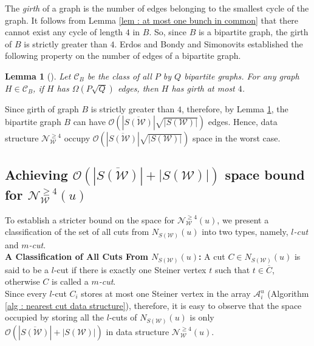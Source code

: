 \documentclass[letterpaper,11pt]{article}
\newtheorem{lemma}{Lemma}[]
\begin{document}
The \textit{girth} of a graph is the number of edges belonging to the smallest cycle of the graph. It follows from Lemma \ref{lem : at most one bunch in common} that there cannot exist any cycle of length $4$ in $B$. So, since $B$ is a bipartite graph, the girth of $B$ is strictly greater than $4$. Erdos \cite{erdos1964extremal} and Bondy and Simonovits \cite{bondy1974cycles} established the following property on the number of edges of a bipartite graph. 
\begin{lemma} [\cite{erdos1964extremal, bondy1974cycles}] \label{lem : girth is 4}
    Let ${\mathcal C}_B$ be the class of all $P$ by $Q$ bipartite graphs. For any graph $H\in {\mathcal C}_B$, if $H$ has ${\Omega}(P\sqrt{Q})$ edges, then $H$ has girth at most $4$.    
\end{lemma}
Since girth of graph $B$ is strictly greater than $4$, therefore, by Lemma \ref{lem : girth is 4}, the bipartite graph $B$ can have ${\mathcal O}(|\overline{S({\mathcal W})}|\sqrt{|S({\mathcal W})|})$ edges. 
Hence, data structure ${\mathcal N}_{\mathcal W}^{\ge 4}$ occupy ${\mathcal O}(|\overline{S({\mathcal W})}|\sqrt{|S({\mathcal W})|})$ space in the worst case. 







\subsection{Achieving ${\mathcal O}(|\overline{S({\mathcal W})}|+|S({\mathcal W})|)$ space bound for ${\mathcal N}_{\mathcal W}^{\ge 4}(u)$}
To establish a stricter bound on the space for ${\mathcal N}_{\mathcal W}^{\ge 4}(u)$, we present a classification of the set of all cuts from $N_{S({\mathcal W})}(u)$ into two types, namely, \textit{$l$-cut} and \textit{$m$-cut}. \\

\noindent
\textbf{A Classification of All Cuts From $N_{S({\mathcal W})}(u)$:} A cut $C\in N_{S({\mathcal W})}(u)$ is said to be a $l$-cut if there is exactly one Steiner vertex $t$ such that $t\in \overline{C}$, otherwise $C$ is called a \textit{$m$-cut}. \\

Since every $l$-cut $C_i$ stores at most one Steiner vertex in the array ${\mathcal A}_i^u$ (Algorithm \ref{alg : nearest cut data structure}), therefore, it is easy to observe that the space occupied by storing all the $l$-cuts of $N_{S({\mathcal W})}(u)$ is only ${\mathcal O}(|\overline{S({\mathcal W})}|+|S({\mathcal W})|)$ in data structure ${\mathcal N}_{\mathcal W}^{\ge 4}(u)$. 
\end{document}
